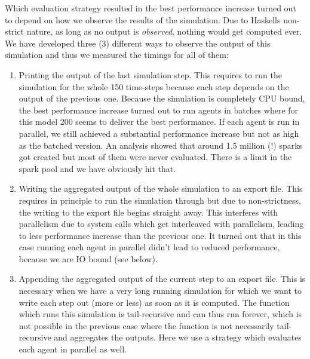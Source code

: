 Which evaluation strategy resulted in the best performance increase turned out to depend on how we observe the results of the simulation. Due to Haskells non-strict nature, as long as no output is \textit{observed}, nothing would get computed ever. We have developed three (3) different ways to observe the output of this simulation and thus we measured the timings for all of them:

\begin{enumerate}
	
	\item Printing the output of the last simulation step. This requires to run the simulation for the whole 150 time-steps because each step depends on the output of the previous one. Because the simulation is completely CPU bound, the best performance increase turned out to run agents in batches where for this model 200 seems to deliver the best performance. If each agent is run in parallel, we still achieved a substantial performance increase but not as high as the batched version. An analysis showed that around 1.5 million (!) sparks got created but most of them were never evaluated. There is a limit in the spark pool and we have obviously hit that.
	
	\item Writing the aggregated output of the whole simulation to an export file. This requires in principle to run the simulation through but due to non-strictness, the writing to the export file begins straight away. This interferes with parallelism due to system calls which get interleaved with parallelism, leading to less performance increase than the previous one. It turned out that in this case running each agent in parallel didn't lead to reduced performance, because we are IO bound (see below).
	
	\item Appending the aggregated output of the current step to an export file. This is necessary when we have a very long running simulation for which we want to write each step out (more or less) as soon as it is computed. The function which runs this simulation is tail-recursive and can thus run forever, which is not possible in the previous case where the function is not necessarily tail-recursive and aggregates the outputs. Here we use a strategy which evaluates each agent in parallel as well.
\end{enumerate}

